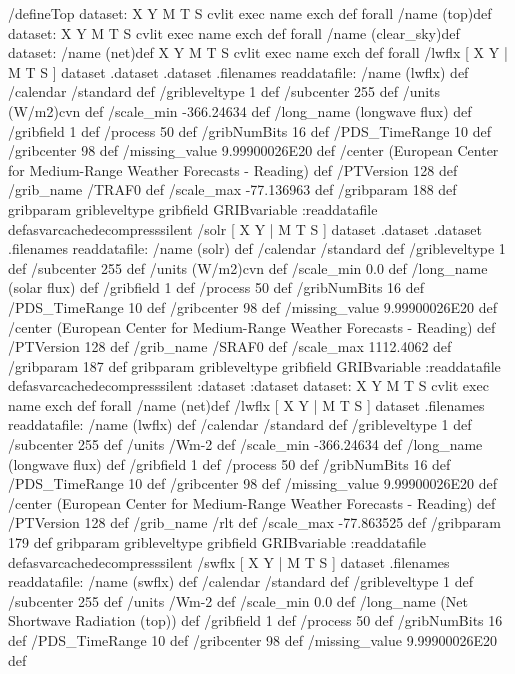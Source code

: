 \begin{ingrid}
/defineTop {
dataset:
{ X Y M T S} cvlit { exec name exch def} forall
/name (top)def
dataset:
{ X Y M T S} cvlit { exec name exch def} forall
/name (clear_sky)def
dataset:
/name (net)def
{ X Y M T S} cvlit { exec name exch def} forall
 /lwflx{
[ X Y | M T S ] dataset .dataset .dataset .filenames readdatafile:
/name (lwflx) def
 /calendar /standard def
 /gribleveltype 1 def
 /subcenter 255 def
 /units (W/m2)cvn def
 /scale_min -366.24634 def
 /long_name (longwave flux) def
 /gribfield 1 def
 /process 50 def
 /gribNumBits 16 def
 /PDS_TimeRange 10 def
 /gribcenter 98 def
 /missing_value 9.99900026E20 def
 /center (European Center for Medium-Range Weather Forecasts - Reading) def
 /PTVersion 128 def
 /grib_name /TRAF0 def
 /scale_max -77.136963 def
 /gribparam 188 def
 gribparam gribleveltype gribfield GRIBvariable
 :readdatafile
}defasvarcachedecompresssilent
 /solr{
[ X Y | M T S ] dataset .dataset .dataset .filenames readdatafile:
/name (solr) def
 /calendar /standard def
 /gribleveltype 1 def
 /subcenter 255 def
 /units (W/m2)cvn def
 /scale_min 0.0 def
 /long_name (solar flux) def
 /gribfield 1 def
 /process 50 def
 /gribNumBits 16 def
 /PDS_TimeRange 10 def
 /gribcenter 98 def
 /missing_value 9.99900026E20 def
 /center (European Center for Medium-Range Weather Forecasts - Reading) def
 /PTVersion 128 def
 /grib_name /SRAF0 def
 /scale_max 1112.4062 def
 /gribparam 187 def
 gribparam gribleveltype gribfield GRIBvariable
 :readdatafile
}defasvarcachedecompresssilent
:dataset
:dataset
dataset:
{ X Y M T S} cvlit { exec name exch def} forall
/name (net)def
 /lwflx{
[ X Y | M T S ] dataset .filenames readdatafile:
/name (lwflx) def
 /calendar /standard def
 /gribleveltype 1 def
 /subcenter 255 def
 /units /Wm-2 def
 /scale_min -366.24634 def
 /long_name (longwave flux) def
 /gribfield 1 def
 /process 50 def
 /gribNumBits 16 def
 /PDS_TimeRange 10 def
 /gribcenter 98 def
 /missing_value 9.99900026E20 def
 /center (European Center for Medium-Range Weather Forecasts - Reading) def
 /PTVersion 128 def
 /grib_name /rlt def
 /scale_max -77.863525 def
 /gribparam 179 def
 gribparam gribleveltype gribfield GRIBvariable
 :readdatafile
}defasvarcachedecompresssilent
 /swflx{
[ X Y | M T S ] dataset .filenames readdatafile:
/name (swflx) def
 /calendar /standard def
 /gribleveltype 1 def
 /subcenter 255 def
 /units /Wm-2 def
 /scale_min 0.0 def
 /long_name (Net Shortwave Radiation (top)) def
 /gribfield 1 def
 /process 50 def
 /gribNumBits 16 def
 /PDS_TimeRange 10 def
 /gribcenter 98 def
 /missing_value 9.99900026E20 def
}}
\end{ingrid}
